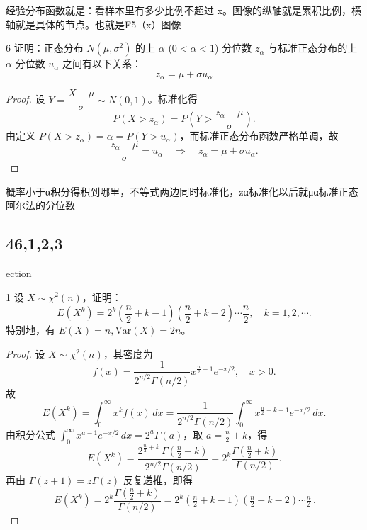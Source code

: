 \begin{dxtips}
    经验分布函数就是：看样本里有多少比例不超过 x。图像的纵轴就是累积比例，横轴就是具体的节点。也就是F5（x）图像
\end{dxtips}
\begin{homework}{6}
证明：正态分布 $N(\mu, \sigma^2)$ 的上 $\alpha$ ($0 < \alpha < 1$) 分位数 $z_\alpha$ 与标准正态分布的上 $\alpha$ 分位数 $u_\alpha$ 之间有以下关系：
$$z_\alpha = \mu + \sigma u_\alpha$$
\end{homework}
\begin{proof}
设 $Y=\dfrac{X-\mu}{\sigma}\sim N(0,1)$。标准化得
\[
P(X>z_\alpha)=P\!\left(Y>\frac{z_\alpha-\mu}{\sigma}\right).
\]
由定义 $P(X>z_\alpha)=\alpha=P(Y>u_\alpha)$，而标准正态分布函数严格单调，故
\[
\frac{z_\alpha-\mu}{\sigma}=u_\alpha
\quad\Longrightarrow\quad
z_\alpha=\mu+\sigma u_\alpha.
\]
\end{proof}
\begin{dxtips}
    概率小于α积分得积到哪里，不等式两边同时标准化，zα标准化以后就μα标准正态阿尔法的分位数
\end{dxtips}
\subsection{46,1,2,3}ection{}
\begin{homework}{1}
设 $X \sim \chi^2(n)$，证明：
$$E(X^k) = 2^k \left(\frac{n}{2} + k - 1\right)\left(\frac{n}{2} + k - 2\right) \cdots \frac{n}{2}, \quad k = 1, 2, \cdots.$$
特别地，有 $E(X) = n, \text{Var}(X) = 2n$。
\end{homework}
\begin{proof}
设 $X\sim\chi^2(n)$，其密度为
\[
f(x)=\frac{1}{2^{n/2}\Gamma(n/2)}x^{\frac n2-1}e^{-x/2},\quad x>0.
\]
故
\[
E(X^k)=\int_0^\infty x^k f(x)\,dx
=\frac{1}{2^{n/2}\Gamma(n/2)}\int_0^\infty x^{\frac n2+k-1}e^{-x/2}\,dx.
\]
由积分公式 $\displaystyle\int_0^\infty x^{a-1}e^{-x/2}\,dx=2^{a}\Gamma(a)$，取 $a=\tfrac n2+k$，得
\[
E(X^k)=\frac{2^{\frac n2+k}\,\Gamma\!\left(\frac n2+k\right)}{2^{n/2}\Gamma(n/2)}
=2^k\frac{\Gamma\!\left(\frac n2+k\right)}{\Gamma(n/2)}.
\]
再由 $\Gamma(z+1)=z\Gamma(z)$ 反复递推，即得
\[
\boxed{\,E(X^k)=2^k\frac{\Gamma\!\left(\tfrac n2+k\right)}{\Gamma(n/2)}
=2^k\left(\tfrac n2+k-1\right)\left(\tfrac n2+k-2\right)\cdots\tfrac n2\,.}
\]
\end{proof}


